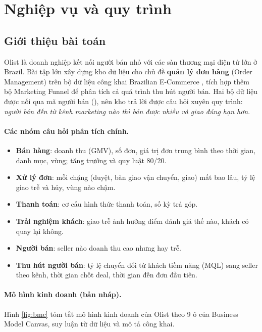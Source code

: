\section{Nghiệp vụ và quy trình}\label{sec:nghiep-vu}
\subsection{Giới thiệu bài toán}
Olist là doanh nghiệp kết nối người bán nhỏ với các sàn thương mại điện tử lớn ở Brazil. Bài tập lớn xây dựng kho dữ liệu cho chủ đề \textbf{quản lý đơn hàng} (Order Management) trên bộ dữ liệu công khai Brazilian E-Commerce \cite{olist_ecommerce}, tích hợp thêm bộ Marketing Funnel \cite{olist_marketing} để phân tích cả quá trình thu hút người bán. Hai bộ dữ liệu được nối qua mã người bán (), nên kho trả lời được câu hỏi xuyên quy trình: \emph{người bán đến từ kênh marketing nào thì bán được nhiều và giao đúng hạn hơn}.


\paragraph{Các nhóm câu hỏi phân tích chính.}
\begin{itemize}
  \item \textbf{Bán hàng}: doanh thu (GMV), số đơn, giá trị đơn trung bình theo thời gian, danh mục, vùng; tăng trưởng và quy luật 80/20.
  \item \textbf{Xử lý đơn}: mỗi chặng (duyệt, bàn giao vận chuyển, giao) mất bao lâu, tỷ lệ giao trễ và hủy, vùng nào chậm.
  \item \textbf{Thanh toán}: cơ cấu hình thức thanh toán, số kỳ trả góp.
  \item \textbf{Trải nghiệm khách}: giao trễ ảnh hưởng điểm đánh giá thế nào, khách có quay lại không.
  \item \textbf{Người bán}: seller nào doanh thu cao nhưng hay trễ.
  \item \textbf{Thu hút người bán}: tỷ lệ chuyển đổi từ khách tiềm năng (MQL) sang seller theo kênh, thời gian chốt deal, thời gian đến đơn đầu tiên.
\end{itemize}

\paragraph{Mô hình kinh doanh (bản nháp).} Hình \ref{fig:bmc} tóm tắt mô hình kinh doanh của Olist theo 9 ô của Business Model Canvas, suy luận từ dữ liệu và mô tả công khai.

